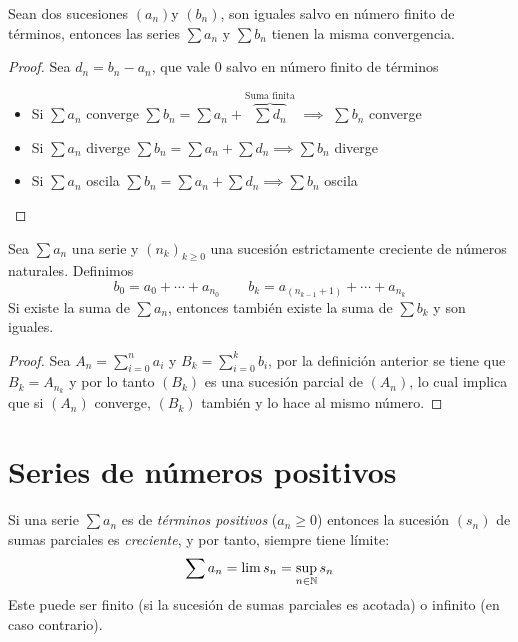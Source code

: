 \begin{prop}
	Sean dos sucesiones $(a_n)$y $(b_n)$, son iguales salvo en número finito de términos,
	entonces las series $\sum a_n$ y $\sum b_n$ tienen la misma convergencia.
\end{prop}

\begin{proof}
	Sea $d_n = b_n - a_n$, que vale 0 salvo en número finito de términos
	\begin{itemize}
		\item Si $\sum a_n$ converge \qquad $\sum b_n = \sum a_n +
		\overbrace{\sum d_n}^\text{Suma finita}$ $\implies$ $\sum b_n$ converge
		\item Si $\sum a_n$ diverge \qquad $\sum b_n = \sum a_n + \sum d_n
		\implies \sum b_n$ diverge
		\item Si $\sum a_n$ oscila \qquad $\sum b_n = \sum a_n + \sum d_n
		\implies \sum b_n$ oscila
	\end{itemize}
\end{proof}

\begin{prop}[Asociatividad]
	Sea $\sum a_n$ una serie y $(n_k)_{k \geq 0}$ una sucesión estrictamente creciente de
	números naturales. Definimos
	\[
		b_0 = a_0 + \cdots + a_{n_0} \qquad b_k = a_{(n_{k-1}+1)} + \cdots + a_{n_k}
	\]
	Si existe la suma de $\sum a_n$, entonces también existe la suma de $\sum b_k$
	y son iguales.
\end{prop}

\begin{proof}
	Sea $A_n = \sum\limits_{i=0}^{n} a_i$ y $B_k = \sum\limits_{i=0}^{k} b_i$, por la
	definición anterior se tiene que $B_k = A_{n_k}$ y por lo tanto $(B_k)$ es una sucesión
	parcial de $(A_n)$, lo cual implica que si $(A_n)$ converge, $(B_k)$ también
	y lo hace al mismo número.
\end{proof}


\section{Series de números positivos}

\begin{prop}
	Si una serie $\sum a_n$ es de \textit{términos positivos} ($a_n \geq 0$) entonces la
	sucesión $(s_n)$ de sumas parciales es \textit{creciente}, y por tanto, siempre tiene
	límite:
	\[
		\sum a_n = \lim s_n = \sup_{n \in \mathbb{N}} s_n
	\]
	Este puede ser finito (si la sucesión de sumas parciales es acotada) o infinito (en caso
	contrario).
\end{prop}

